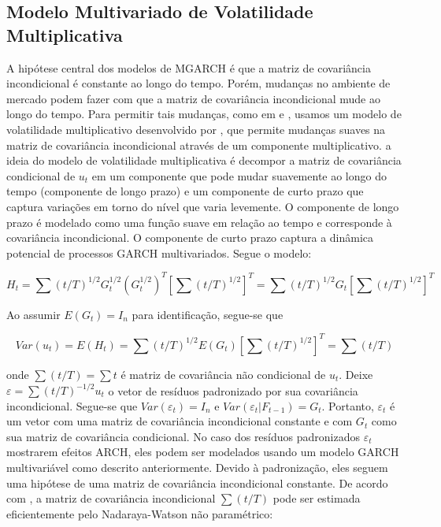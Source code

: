 	
	 \subsection{Modelo Multivariado de Volatilidade Multiplicativa}	
	
	A hipótese central dos modelos de MGARCH é que a matriz de covariância incondicional é constante ao longo do tempo. Porém, mudanças no ambiente de mercado  podem fazer com que a matriz de covariância incondicional mude ao longo do tempo. Para permitir tais mudanças, como em  e ,  usamos  um modelo de volatilidade multiplicativo desenvolvido por , que permite mudanças suaves na matriz de covariância incondicional através de um componente multiplicativo. a ideia do modelo de volatilidade multiplicativa é decompor a matriz de covariância condicional de $u_t$ em um componente que pode mudar suavemente ao longo do tempo (componente de longo prazo) e um componente  de curto prazo que captura variações em torno do nível que varia levemente. O componente de longo prazo é modelado como uma função suave em relação ao tempo e corresponde à covariância incondicional. O componente de curto prazo captura a dinâmica potencial de processos GARCH multivariados. Segue o modelo:
	
	\begin{equation}
	H_t=\sum (t/T)^{1/2} G_t^ {1/2} (G_t^{1/2})^T [\sum (t/T)^{1/2}]^T=\sum (t/T)^{1/2} G_t[\sum(t/T)^{1/2}]^T
	\end{equation}
	
	Ao assumir $E (G_t) = I_n$ para identificação, segue-se que
 	
 	\begin{equation}
 	Var(u_t)= E(H_t)= \sum (t/T)^{1/2} E(G_t)[\sum (t/T)^{1/2}]^T=\sum (t/T)
 	\end{equation}
 	
 	onde $\sum (t/T)=\sum{t}$ é matriz de covariância não condicional de $u_t$. Deixe $\varepsilon=\sum (t/T)^{-1/2}u_t$  o vetor de resíduos padronizado por sua covariância incondicional. Segue-se que $Var (\varepsilon_t) = I_n$ e $Var (\varepsilon_t | F_{t - 1}) = G_t$. Portanto, $\varepsilon_t$ é um vetor com uma matriz de covariância incondicional constante e com $G_t$ como sua matriz de covariância condicional. No caso dos resíduos padronizados $\varepsilon_t$ mostrarem efeitos ARCH, eles podem ser modelados usando um modelo GARCH multivariável como descrito anteriormente. Devido à padronização, eles seguem uma hipótese de uma matriz de covariância incondicional constante. De acordo com , a matriz de covariância incondicional $\sum (t/T)$ pode ser estimada eficientemente pelo Nadaraya-Watson não paramétrico:
 	
